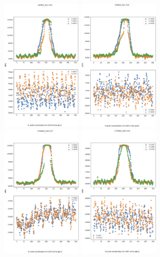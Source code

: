 \begin{figure}
\centering
\includegraphics[width=0.35\textwidth]{figures/ITLDip_Spot_Cutout.png}
\includegraphics[width=0.35\textwidth]{figures/ITLDip_Spot_Cutout2.png} \\
\includegraphics[width=0.35\textwidth]{figures/ITLDip_Spot_Cutout3.png}
\includegraphics[width=0.35\textwidth]{figures/ITLDip_Spot_Cutout4.png}

\end{figure}
